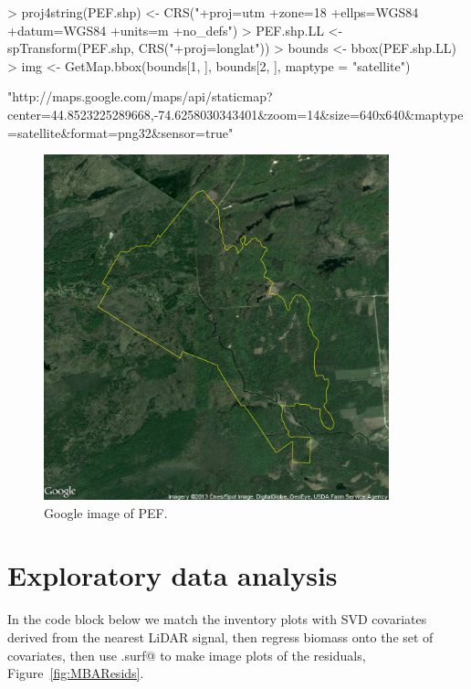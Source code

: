 \documentclass{article}
\begin{document}
\begin{Schunk}
\begin{Sinput}
> proj4string(PEF.shp) <- CRS("+proj=utm +zone=18 +ellps=WGS84 +datum=WGS84 +units=m +no_defs")
> PEF.shp.LL <- spTransform(PEF.shp, CRS("+proj=longlat"))
> bounds <- bbox(PEF.shp.LL)
> img <- GetMap.bbox(bounds[1, ], bounds[2, ], maptype = "satellite")
\end{Sinput}
\begin{Soutput}
[1] "http://maps.google.com/maps/api/staticmap?center=44.8523225289668,-74.6258030343401&zoom=14&size=640x640&maptype=satellite&format=png32&sensor=true"
\end{Soutput}
\end{Schunk}
\begin{figure}
\begin{center}
\includegraphics[width=10cm]{figures/fig-Google}
\end{center}
\caption{Google image of PEF.}
\label{fig:Google}
\end{figure}

\section{Exploratory data analysis}
In the code block below we match the inventory plots with SVD covariates derived from the nearest LiDAR signal, then regress biomass onto the set of covariates, then use \verb@mba.surf@ to make image plots of the residuals, Figure~\ref{fig:MBAResids}.
\end{document}
